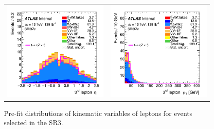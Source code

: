 \begin{figure}[!htbp]
\begin{tabular}{cc}
		\includegraphics[width=.35\textwidth]{Appendices/AP6/figures/SR3_UsingDL1rc/lep3_eta} &
		\includegraphics[width=.35\textwidth]{Appendices/AP6/figures/SR3_UsingDL1rc/lep3_pt} \\
	\end{tabular}
	\caption{Pre-fit distributions of kinematic variables of leptons for events selected in the SR3\tZc.
		\ErrStatOnly
		\Blinded
	}%
	\label{fig:sel:sr3:leps}
\end{figure}

